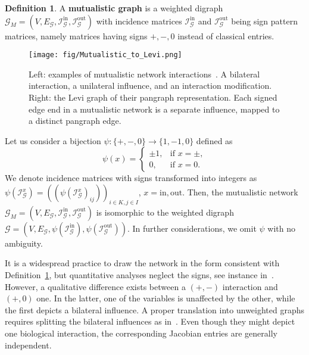 \documentclass[a4paper,12pt]{article}
\theoremstyle{definition}
\newtheorem{definition}{Definition}
\theoremstyle{remark}
\newcommand{\mG}{\mathcal{G}}
\newcommand{\EG}{E_{\mathcal{G}}}
\newcommand{\tin}{\mathrm{in}}
\newcommand{\out}{\mathrm{out}}
\newcommand{\inci}{\mathcal{I}^{\tin}}
\newcommand{\inco}{\mathcal{I}^{\out}}
\begin{document}
\begin{definition}\label{def:mutualistic_graph}
    A \textbf{mutualistic graph} is a weighted digraph $\mathcal{G}_M=(V,\EG, \inci_\mG,\inco_\mG)$ with incidence matrices $\inci_\mG$ and $\inco_\mG$ being sign pattern matrices, namely matrices having signs $+,-,0$ instead of classical entries.
\end{definition}


\begin{figure}
    \centering
    \texttt{[image: fig/Mutualistic\_to\_Levi.png]}
    \caption{Left: examples of mutualistic network interactions~\cite{GOLUBSKI2016344}. A bilateral interaction, a unilateral influence, and an interaction modification. Right: the Levi graph of their pangraph representation. Each signed edge end in a mutualistic network is a separate influence, mapped to a distinct pangraph edge.}\label{fig:minus_minus_rep}
\end{figure}

Let us consider a bijection $\psi:\{+,-,0\} \to \{1,-1,0\}$ defined as
\begin{equation}\label{eq:psi}
\psi(x)=\left\{\begin{array}{ll} \pm 1, &\textrm{if }x=\pm,\\
0,&\textrm{if }x=0.
\end{array}\right.
\end{equation}
We denote incidence matrices with signs transformed into integers as $\psi(\mathcal{I}^x_{\mG})=\left((\psi(\mathcal{I}^x_{\mG})_{ij})\right)_{i\in K,j\in I}$, $x=\textrm{in},\textrm{out}$. Then, the mutualistic network $\mG_M=(V,\EG, \inci_\mG,\inco_\mG)$ is isomorphic to the weighted digraph $\mG=(V,\EG, \psi(\inci_\mG),\psi(\inco_\mG)).$ In further considerations, we omit $\psi$ with no ambiguity.


It is a widespread practice to draw the network in the form consistent with Definition~\ref{def:mutualistic_graph}, but quantitative analyses neglect the signs, see instance in~\cite{GOLUBSKI2016344}. However, a qualitative difference exists between a $(+,-)$ interaction and $(+,0)$ one. In the latter, one of the variables is unaffected by the other, while the first depicts a bilateral influence. A proper translation into unweighted graphs requires splitting the bilateral influences as in~\cite{HIGASHI_1995_ecological_interaction_networks}. Even though they might depict one biological interaction, the corresponding Jacobian entries are generally independent.
\end{document}
